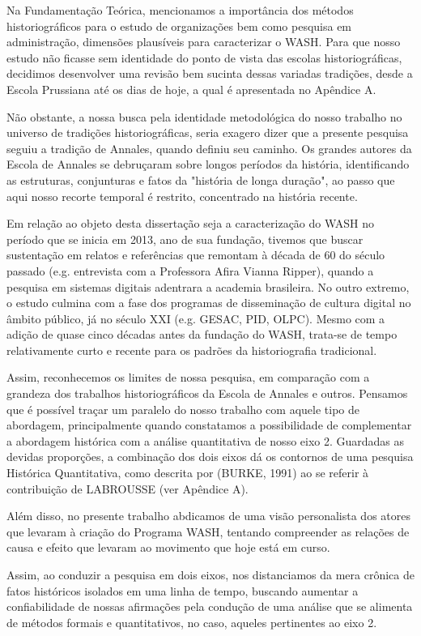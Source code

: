Na Fundamentação Teórica, mencionamos a importância dos métodos historiográficos para o estudo de organizações bem como pesquisa em administração, dimensões plausíveis para caracterizar o WASH. Para que nosso estudo não ficasse sem identidade do ponto de vista das escolas historiográficas, decidimos desenvolver uma revisão bem sucinta dessas variadas tradições, desde a Escola Prussiana até os dias de hoje, a qual é apresentada no Apêndice A.

Não obstante, a nossa busca pela identidade metodológica do nosso trabalho no universo de tradições historiográficas, seria exagero dizer que a presente pesquisa seguiu a tradição de Annales, quando definiu seu caminho. Os grandes autores da Escola de Annales se debruçaram sobre longos períodos da história, identificando as estruturas, conjunturas e fatos da "história de longa duração", ao passo que aqui nosso recorte temporal é restrito, concentrado na história recente.

Em relação ao objeto desta dissertação seja a caracterização do WASH no período que se inicia em 2013, ano de sua fundação, tivemos que buscar sustentação em relatos e referências que remontam à década de 60 do século passado (e.g. entrevista com a Professora Afira Vianna Ripper), quando a pesquisa em sistemas digitais adentrara a academia brasileira. No outro extremo, o estudo culmina com a fase dos programas de disseminação de cultura digital no âmbito público, já no século XXI (e.g. GESAC, PID, OLPC).  Mesmo com a adição de quase cinco décadas antes da fundação do WASH, trata-se de tempo relativamente curto e recente para os padrões da historiografia tradicional.

Assim, reconhecemos os limites de nossa pesquisa, em comparação com a grandeza dos trabalhos historiográficos da Escola de Annales e outros. Pensamos que é possível traçar um paralelo do nosso trabalho com aquele tipo de abordagem, principalmente quando constatamos a possibilidade de complementar a abordagem histórica com a análise quantitativa de nosso eixo 2. Guardadas as devidas proporções, a combinação dos dois eixos dá os contornos de uma pesquisa Histórica Quantitativa, como descrita por (BURKE, 1991) ao se referir à contribuição de LABROUSSE (ver Apêndice A).

Além disso, no presente trabalho abdicamos de uma visão personalista dos atores que levaram à criação do Programa WASH, tentando compreender as relações de causa e efeito que levaram ao movimento que hoje está em curso.

Assim, ao conduzir a pesquisa em dois eixos, nos distanciamos da mera crônica de fatos históricos isolados em uma linha de tempo, buscando aumentar a confiabilidade de nossas afirmações pela condução de uma análise que se alimenta de métodos formais e quantitativos, no caso, aqueles pertinentes ao eixo 2.

